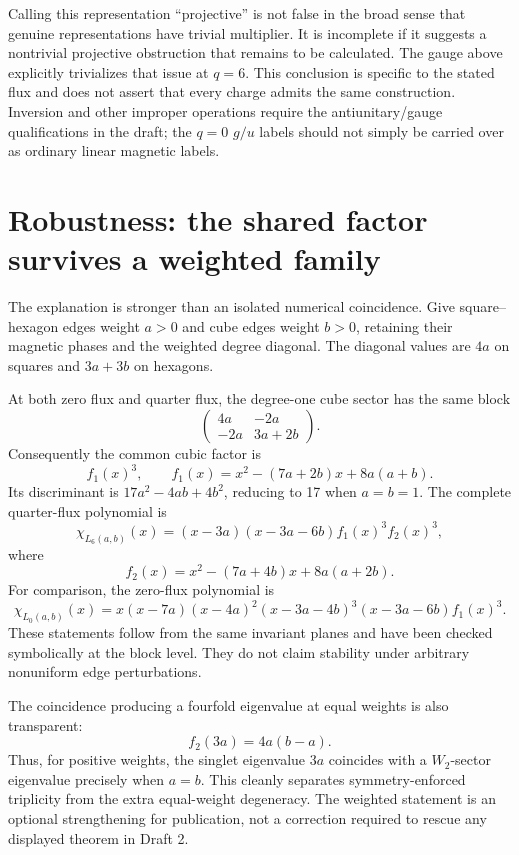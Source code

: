\documentclass[11pt,a4paper]{article}
\begin{document}
Calling this representation ``projective'' is not false in the broad sense that genuine representations have trivial multiplier. It is incomplete if it suggests a nontrivial projective obstruction that remains to be calculated. The gauge above explicitly trivializes that issue at $q=6$. This conclusion is specific to the stated flux and does not assert that every charge admits the same construction. Inversion and other improper operations require the antiunitary/gauge qualifications in the draft; the $q=0$ $g/u$ labels should not simply be carried over as ordinary linear magnetic labels.

\section{Robustness: the shared factor survives a weighted family}
The explanation is stronger than an isolated numerical coincidence. Give square--hexagon edges weight $a>0$ and cube edges weight $b>0$, retaining their magnetic phases and the weighted degree diagonal. The diagonal values are $4a$ on squares and $3a+3b$ on hexagons.

At both zero flux and quarter flux, the degree-one cube sector has the same block
\[
 \begin{pmatrix}4a&-2a\\-2a&3a+2b\end{pmatrix}.
\]
Consequently the common cubic factor is
\begin{equation}
 f_1(x)^3,\qquad
 f_1(x)=x^2-(7a+2b)x+8a(a+b).
\end{equation}
Its discriminant is $17a^2-4ab+4b^2$, reducing to 17 when $a=b=1$. The complete quarter-flux polynomial is
\begin{equation}\label{eq:weighted}
 \chi_{L_6(a,b)}(x)=(x-3a)(x-3a-6b)f_1(x)^3f_2(x)^3,
\end{equation}
where
\[
 f_2(x)=x^2-(7a+4b)x+8a(a+2b).
\]
For comparison, the zero-flux polynomial is
\[
 \chi_{L_0(a,b)}(x)=x(x-7a)(x-4a)^2(x-3a-4b)^3
 (x-3a-6b)f_1(x)^3.
\]
These statements follow from the same invariant planes and have been checked symbolically at the block level. They do not claim stability under arbitrary nonuniform edge perturbations.

The coincidence producing a fourfold eigenvalue at equal weights is also transparent:
\[
 f_2(3a)=4a(b-a).
\]
Thus, for positive weights, the singlet eigenvalue $3a$ coincides with a $W_2$-sector eigenvalue precisely when $a=b$. This cleanly separates symmetry-enforced triplicity from the extra equal-weight degeneracy. The weighted statement is an optional strengthening for publication, not a correction required to rescue any displayed theorem in Draft 2.
\end{document}
